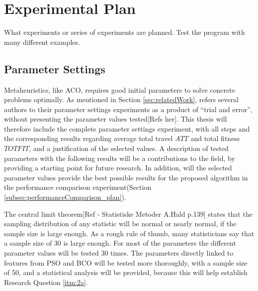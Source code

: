 \section{Experimental Plan}

What experiments or series of experiments are planned. Test the program with many different examples.

\subsection{Parameter Settings}
\label{subsec:parameterSettings_plan}
Metaheuristics, like ACO, requires good initial parameters to solve concrete problems optimally. As mentioned in Section \vref{sec:relatedWork}, refers several authors to their parameter settings experiments as a product of ``trial and error'', without presenting the parameter values tested[Refs her]. This thesis will therefore include the complete parameter settings experiment, with all steps and the corresponding results regarding average total travel $ATT$ and total fitness $TOTFIT$, and a justification of the selected values. A description of tested parameters with the following results will be a contributions to the field, by providing a starting point for future research. In addition, will the selected parameter values provide the best possible results for the proposed algorithm in the performance comparison experiment(Section \ref{subsec:performanceComparison_plan}).

The central limit theorem[Ref - Statistiske Metoder A.Hald p.139] states that the sampling distribution of any statistic will be normal or nearly normal, if the sample size is large enough. As a rough rule of thumb, many statisticians say that a sample size of 30 is large enough. For most of the parameters the different parameter values will be tested 30 times. The parameters directly linked to features from PSO and BCO will be tested more thoroughly, with a sample size of 50, and a statistical analysis will be provided, because this will help establish Research Question \vref{itm:2a}. 



